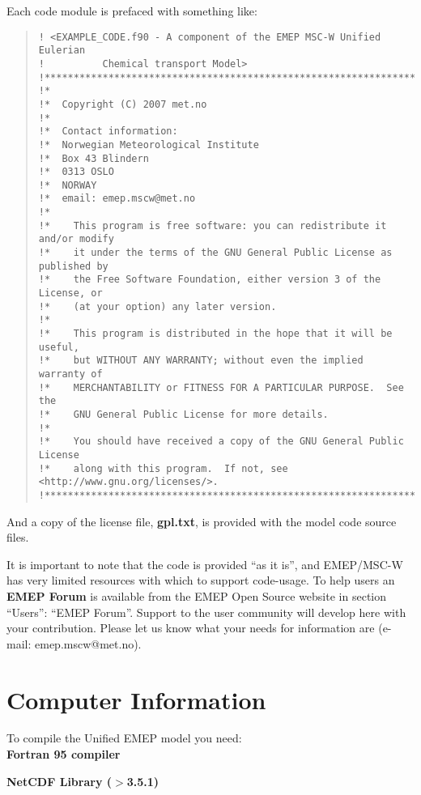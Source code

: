Each code module is prefaced with something like:
\begin{quote}
\begin{small}
\begin{verbatim}
! <EXAMPLE_CODE.f90 - A component of the EMEP MSC-W Unified Eulerian
!          Chemical transport Model>
!*****************************************************************************!
!*
!*  Copyright (C) 2007 met.no
!*
!*  Contact information:
!*  Norwegian Meteorological Institute
!*  Box 43 Blindern
!*  0313 OSLO
!*  NORWAY
!*  email: emep.mscw@met.no
!*
!*    This program is free software: you can redistribute it and/or modify
!*    it under the terms of the GNU General Public License as published by
!*    the Free Software Foundation, either version 3 of the License, or
!*    (at your option) any later version.
!*
!*    This program is distributed in the hope that it will be useful,
!*    but WITHOUT ANY WARRANTY; without even the implied warranty of
!*    MERCHANTABILITY or FITNESS FOR A PARTICULAR PURPOSE.  See the
!*    GNU General Public License for more details.
!*
!*    You should have received a copy of the GNU General Public License
!*    along with this program.  If not, see <http://www.gnu.org/licenses/>.
!*****************************************************************************!
\end{verbatim}
\end{small}
\end{quote}
And a copy of the license file, {\bf gpl.txt}, is provided with the
model code source files.

\noindent It is important to note that the code is provided ``as it is'', 
and EMEP/MSC-W has very limited resources with which to support
code-usage. To help users an {\bf EMEP Forum} is available from the
EMEP Open Source website in section ``Users'': ``EMEP Forum''. 
Support to the user community will develop here with your
contribution. 
Please let us know what your needs for information are 
(e-mail: emep.mscw@met.no).

\newpage

\section{Computer Information}
\label{sec:compinf}

To compile the Unified EMEP model you need:\\

\textbf{Fortran 95 compiler}

\textbf{NetCDF Library ($>$3.5.1)}

